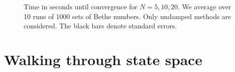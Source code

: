 \documentclass[11pt, a4paper]{report} %
\begin{document}
\begin{figure}[ph]
  \centering
  \\
  \\
  \caption{Time in seconds until convergence for \(N=5,10,20\). We average over 10 runs of 1000 sets of Bethe numbers. Only undamped methods are considered. The black bars denote standard errors.}\label{fig:convtimes}
\end{figure}

\section{Walking through state space}
\end{document}

